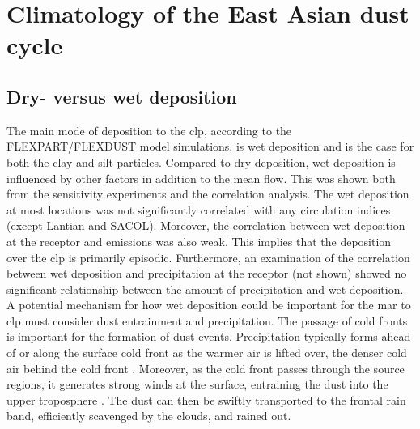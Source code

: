 \section{Climatology of the East Asian dust cycle}\label{sec:climatlogy_EA_dust_cycle_discussion}



\subsection{Dry- versus wet deposition}\label{sec:wet_dry_characteristics}
The main mode of deposition to the \acrshort{clp}, according to the FLEXPART/FLEXDUST model simulations, is wet deposition and is the case for both the clay and silt particles. 
Compared to dry deposition, wet deposition is influenced by other factors in addition to the mean flow. This was shown both from the sensitivity experiments and the correlation analysis. 
The wet deposition at most locations was not significantly correlated with any circulation indices (except Lantian and SACOL).
Moreover, the correlation between wet deposition at the receptor and emissions was also weak. 
This implies that the deposition over the \acrshort{clp} is primarily episodic. 
Furthermore, an examination of the correlation between wet deposition and precipitation at the receptor (not shown) showed no significant relationship between the amount of precipitation and wet deposition.  
A potential mechanism for how wet deposition could be important for the \acrshort{mar} to \acrshort{clp} must consider dust entrainment and precipitation. 
The passage of cold fronts is important for the formation of dust events. 
Precipitation typically forms ahead of or along the surface cold front as the warmer air is lifted over, the denser cold air behind the cold front  \parencite{markowski2011mesoscale}. 
Moreover, as the cold front passes through the source regions, it generates strong winds at the surface, entraining the dust into the upper troposphere \parencite{li2015multi}. 
The dust can then be swiftly transported to the frontal rain band, efficiently scavenged by the clouds, and rained out. 

